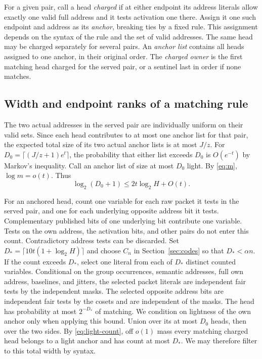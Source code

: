 \documentclass[11pt]{article}
\begin{document}
For a given pair, call a head \emph{charged} if at either endpoint its
address literals allow exactly one valid full address and it tests
activation one there. Assign it one such endpoint and address as its
\emph{anchor}, breaking ties by a fixed rule. This assignment depends
on the syntax of the rule and the set of valid addresses. The same head
may be charged separately for several pairs. An \emph{anchor list}
contains all heads assigned to one anchor, in their original order.
The \emph{charged owner} is the first matching head charged for the
served pair, or a sentinel last in order if none matches.

\subsection{Width and endpoint ranks of a matching rule}\label{sec:width}

The two actual addresses in the served pair are individually uniform on
their valid sets. Since each head contributes to at most one anchor list
for that pair, the expected total size of its two actual anchor lists
is at most $J/z$. For
$D_0=\lceil(J/z+1)e^t\rceil$, the probability that either list exceeds
$D_0$ is $O(e^{-t})$ by Markov's inequality. Call an anchor list of size
at most $D_0$ light. By \eqref{eq:m}, $\log m=o(t)$. Thus
\begin{equation}\label{eq:light-count}
  \log_2(D_0+1)\le 2t\log_2H+O(t).
\end{equation}

For an anchored head, count one variable for each raw packet it tests
in the served pair, and one for each underlying opposite address bit it
tests. Complementary published bits of one underlying bit contribute
one variable. Tests on the own address, the activation bits, and other
pairs do not enter this count. Contradictory address tests can be
discarded. Set $D_*=\lceil10t(1+\log_2 H)\rceil$ and choose $C_n$ in
Section~\ref{sec:codes} so that $D_*<\alpha n$. If the count exceeds
$D_*$, select one literal from each of $D_*$ distinct counted variables.
Conditional on the group occurrences, semantic addresses, full own
address, baselines, and jitters, the selected packet literals are
independent fair tests by the independent masks. The selected opposite
address bits are independent fair tests by the cosets and are
independent of the masks. The head has probability at most $2^{-D_*}$
of matching. We condition on lightness of the own anchor only when
applying this bound. Union over its at most $D_0$ heads, then over the
two sides. By \eqref{eq:light-count}, off $o(1)$ mass every matching
charged head belongs to a light anchor and has count at most $D_*$.
We may therefore filter to this total width by syntax.
\end{document}
